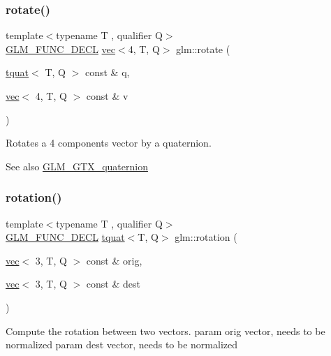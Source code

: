 \subsubsection{\texorpdfstring{rotate()}{rotate()}\hspace{0.1cm}{\footnotesize\ttfamily [2/2]}}
{\footnotesize\ttfamily template$<$typename T , qualifier Q$>$ \\
\mbox{\hyperlink{setup_8hpp_ab2d052de21a70539923e9bcbf6e83a51}{G\+L\+M\+\_\+\+F\+U\+N\+C\+\_\+\+D\+E\+CL}} \mbox{\hyperlink{structglm_1_1vec}{vec}}$<$4, T, Q$>$ glm\+::rotate (\begin{DoxyParamCaption}\item[{\mbox{\hyperlink{structglm_1_1tquat}{tquat}}$<$ T, Q $>$ const \&}]{q,  }\item[{\mbox{\hyperlink{structglm_1_1vec}{vec}}$<$ 4, T, Q $>$ const \&}]{v }\end{DoxyParamCaption})}

Rotates a 4 components vector by a quaternion.

\begin{DoxySeeAlso}{See also}
\mbox{\hyperlink{group__gtx__quaternion}{G\+L\+M\+\_\+\+G\+T\+X\+\_\+quaternion}} 
\end{DoxySeeAlso}
\mbox{\label{group__gtx__quaternion_ga5a729f33cbd904c9ca14cdf25d0a07e4}} 
\subsubsection{\texorpdfstring{rotation()}{rotation()}}
{\footnotesize\ttfamily template$<$typename T , qualifier Q$>$ \\
\mbox{\hyperlink{setup_8hpp_ab2d052de21a70539923e9bcbf6e83a51}{G\+L\+M\+\_\+\+F\+U\+N\+C\+\_\+\+D\+E\+CL}} \mbox{\hyperlink{structglm_1_1tquat}{tquat}}$<$T, Q$>$ glm\+::rotation (\begin{DoxyParamCaption}\item[{\mbox{\hyperlink{structglm_1_1vec}{vec}}$<$ 3, T, Q $>$ const \&}]{orig,  }\item[{\mbox{\hyperlink{structglm_1_1vec}{vec}}$<$ 3, T, Q $>$ const \&}]{dest }\end{DoxyParamCaption})}

Compute the rotation between two vectors. param orig vector, needs to be normalized param dest vector, needs to be normalized

